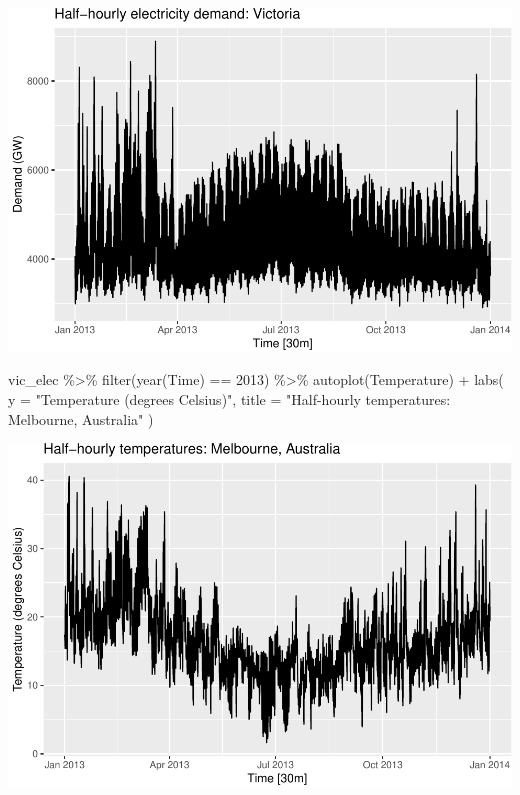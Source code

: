 \documentclass[
]{book}
\newenvironment{Shaded}{\begin{snugshade}}{\end{snugshade}}
\newcommand{\AttributeTok}[1]{\textcolor[rgb]{0.77,0.63,0.00}{#1}}
\newcommand{\DecValTok}[1]{\textcolor[rgb]{0.00,0.00,0.81}{#1}}
\newcommand{\FunctionTok}[1]{\textcolor[rgb]{0.00,0.00,0.00}{#1}}
\newcommand{\NormalTok}[1]{#1}
\newcommand{\SpecialCharTok}[1]{\textcolor[rgb]{0.00,0.00,0.00}{#1}}
\newcommand{\StringTok}[1]{\textcolor[rgb]{0.31,0.60,0.02}{#1}}
\begin{document}
\includegraphics{graphics/unnamed-chunk-19-1.pdf}

\begin{Shaded}
\begin{Highlighting}[]
\NormalTok{vic\_elec }\SpecialCharTok{\%\textgreater{}\%}
  \FunctionTok{filter}\NormalTok{(}\FunctionTok{year}\NormalTok{(Time) }\SpecialCharTok{==} \DecValTok{2013}\NormalTok{) }\SpecialCharTok{\%\textgreater{}\%}
  \FunctionTok{autoplot}\NormalTok{(Temperature) }\SpecialCharTok{+}
  \FunctionTok{labs}\NormalTok{(}
    \AttributeTok{y =} \StringTok{"Temperature (degrees Celsius)"}\NormalTok{,}
    \AttributeTok{title =} \StringTok{"Half{-}hourly temperatures: Melbourne, Australia"}
\NormalTok{  )}
\end{Highlighting}
\end{Shaded}

\includegraphics{graphics/unnamed-chunk-20-1.pdf}
\end{document}
